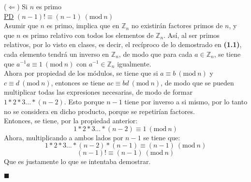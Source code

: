 \documentclass[letter]{article}
\begin{document}
\begin{pregunta}{2}
\begin{enumerate}
		($\Leftarrow$) Si $n$ es primo\\
		\underline{PD} $(n-1)!\equiv (n-1)\ (\text{mod} \ n)$\\
		Asumir que $n$ es primo, implica que en $\mathbb{Z}_n$ no existirán factores primos de $n$, y que $n$ es primo relativo con todos los elementos de $\mathbb{Z}_n$. Así, al ser primos relativos, por lo visto en clases, es decir, el recíproco de lo demostrado en \textbf{(1.1)}, cada elemento tendrá un inverso en $\mathbb{Z}_n$, de modo que para cada $a \in \mathbb{Z}_n$, se tiene que $a^{-1}a\equiv 1 \ (\text{mod} \ n)$ con $a^{-1} \in \mathbb{Z}_n$ igualmente.\\
		Ahora por propiedad de los módulos, se tiene que si $a \equiv b \ (\text{mod} \ n)$ y $c \equiv d\ (\text{mod} \ n)$, entonces se tiene $ac \equiv bd \ (\text{mod} \ n)$, de modo que se pueden multiplicar todas las expresiones necesarias, de modo de formar $1*2*3...*(n-2)$. Esto porque $n-1$ tiene por inverso a si mismo, por lo tanto no se considera en dicho producto, porque se repetirían factores.\\
		Entonces, se tiene, por la propiedad anterior:
		$$1*2*3...*(n-2)\equiv 1 \ (\text{mod} \ n)$$
		Ahora, multiplicando a ambos lados por $n-1$ se tiene que:
		$$1*2*3...*(n-2)*(n-1)\equiv (n-1) \ (\text{mod} \ n)$$
		$$(n-1)!\equiv (n-1) \ (\text{mod} \ n)$$
		Que es justamente lo que se intentaba demostrar.
		\begin{flushright}$\blacksquare$\end{flushright}
		\end{enumerate}

	\end{pregunta}
\end{document}
